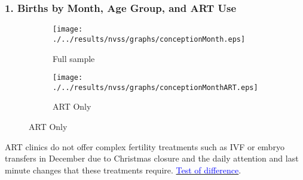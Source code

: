 \documentclass[10pt,letterpaper,subeqn]{beamer}
\begin{document}
\begin{frame}[label=MainDiff]
\frametitle{1. Births by Month, Age Group, and ART Use}
\begin{figure}[htpb!]
\begin{center}
\caption{Birth Prevalence by Month, Age Group, and ART Usage}
\label{bqFig:concepMonth}
\begin{subfigure}{.5\textwidth}
  \centering
  \texttt{[image: ./../results/nvss/graphs/conceptionMonth.eps]}
  \caption{Full sample}
  \label{fig:concepAbs}
\end{subfigure}%
\begin{subfigure}{.5\textwidth}
  \centering
  \texttt{[image: ./../results/nvss/graphs/conceptionMonthART.eps]}
  \caption{ART Only}
  \label{fig:concepAbsART}
\end{subfigure}
\end{center}
\end{figure}
ART clinics do not offer complex fertility treatments such as IVF or embryo transfers in December due to Christmas closure and the daily attention and last minute changes that these treatments require. \hyperlink{Diff}{\textcolor{blue}{Test of difference}}.
\end{frame}
\end{document}
